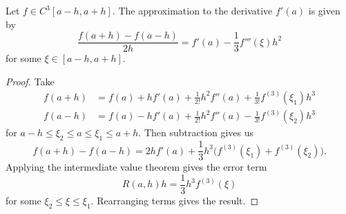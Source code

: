 \begin{defn}
  Let $f\in C^{3}[a-h,a+h]$.
  The  approximation to the derivative $f'(a)$
  is given by
  \begin{equation}
    \frac{f(a+h)-f(a-h)}{2h} = f'(a) - \frac{1}{3}f'''(\xi)h^{2}
  \end{equation}
  for some $\xi\in[a-h,a+h]$.
\end{defn}
\begin{proof}
  Take
  \begin{subequations}
  \begin{align}
    f(a+h) &= f(a) + hf'(a) + \frac{1}{2!}h^{2}f''(a) + \frac{1}{3!}f^{(3)}(\xi_{1})h^{3}\\
    f(a-h) &= f(a) - hf'(a) + \frac{1}{2!}h^{2}f''(a)
    - \frac{1}{3!}f^{(3)}(\xi_{2})h^{3}
  \end{align}
  \end{subequations}
  for $a-h\leq\xi_{2}\leq a\leq\xi_{1}\leq a+h$.
  Then subtraction gives us
  \begin{equation}
    f(a+h)-f(a-h) = 2hf'(a) + \frac{1}{3}h^{3}\bigl(f^{(3)}(\xi_{1})+f^{(3)}(\xi_{2})\bigr).
  \end{equation}
  Applying the intermediate value theorem gives the error term
  \begin{equation}
    R(a,h)h = \frac{1}{3}h^{3}f^{(3)}(\xi)
  \end{equation}
  for some $\xi_{2}\leq \xi\leq\xi_{1}$. Rearranging terms gives the result.
\end{proof}

